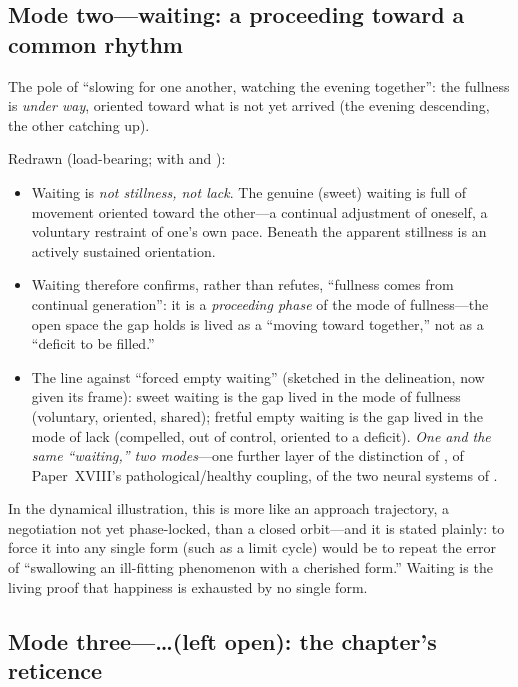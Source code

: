 \subsection{Mode two---waiting: a proceeding toward a common rhythm}
\label{p19:sub:modes-waiting}

The pole of ``slowing for one another, watching the evening together'': the fullness is \emph{under way}, oriented toward what is not yet arrived (the evening descending, the other catching up).

Redrawn (load-bearing; with  and ):
\begin{itemize}
  \item Waiting is \emph{not stillness, not lack}. The genuine (sweet) waiting is full of movement oriented toward the other---a continual adjustment of oneself, a voluntary restraint of one's own pace. Beneath the apparent stillness is an actively sustained orientation.
  \item Waiting therefore confirms, rather than refutes, ``fullness comes from continual generation'': it is a \emph{proceeding phase} of the mode of fullness---the open space the gap holds is lived as a ``moving toward together,'' not as a ``deficit to be filled.''
  \item The line against ``forced empty waiting'' (sketched in the delineation, now given its frame): sweet waiting is the gap lived in the mode of fullness (voluntary, oriented, shared); fretful empty waiting is the gap lived in the mode of lack (compelled, out of control, oriented to a deficit). \emph{One and the same ``waiting,'' two modes}---one further layer of the distinction of , of Paper~XVIII's pathological/healthy coupling, of the two neural systems of .
\end{itemize}
In the dynamical illustration, this is more like an approach trajectory, a negotiation not yet phase-locked, than a closed orbit---and it is stated plainly: to force it into any single form (such as a limit cycle) would be to repeat the error of ``swallowing an ill-fitting phenomenon with a cherished form.'' Waiting is the living proof that happiness is exhausted by no single form.

\subsection{Mode three---\ldots (left open): the chapter's reticence}
\label{p19:sub:modes-open}

